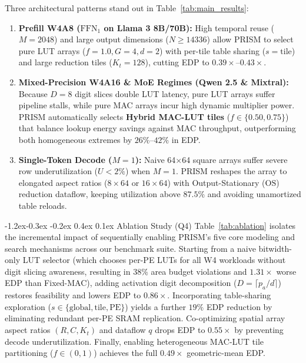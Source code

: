\documentclass[10pt,letterpaper,twocolumn]{article}
\makeatletter
\renewcommand\subsection{\@startsection{subsection}{2}{\z@}%
  {-1.2ex\@plus -0.3ex \@minus -0.2ex}%
  {0.4ex \@plus 0.1ex}%
  {\normalfont\normalsize\bfseries}}
\makeatother
\begin{document}
Three architectural patterns stand out in Table~\ref{tab:main_results}:
\begin{enumerate}
  \setlength{\itemsep}{1pt}\setlength{\parskip}{0pt}
  \item \textbf{Prefill W4A8 ($\text{FFN}_1$ on Llama 3 8B/70B):} High temporal reuse ($M=2048$) and large output dimensions ($N \ge 14336$) allow PRISM to select pure LUT arrays ($f=1.0, G=4, d=2$) with per-tile table sharing ($s=\text{tile}$) and large reduction tiles ($K_t=128$), cutting EDP to $0.39\times$--$0.43\times$.
  \item \textbf{Mixed-Precision W4A16 \& MoE Regimes (Qwen 2.5 \& Mixtral):} Because $D=8$ digit slices double LUT latency, pure LUT arrays suffer pipeline stalls, while pure MAC arrays incur high dynamic multiplier power. PRISM automatically selects \textbf{Hybrid MAC-LUT tiles} ($f \in \{0.50, 0.75\}$) that balance lookup energy savings against MAC throughput, outperforming both homogeneous extremes by $26\%$--$42\%$ in EDP.
  \item \textbf{Single-Token Decode ($M=1$):} Naive 64$\times$64 square arrays suffer severe row underutilization ($U < 2\%$) when $M=1$. PRISM reshapes the array to elongated aspect ratios ($8\times 64$ or $16\times 64$) with Output-Stationary ($\text{OS}$) reduction dataflow, keeping utilization above $87.5\%$ and avoiding unamortized table reloads.
\end{enumerate}

\subsection{Ablation Study (Q4)}
Table~\ref{tab:ablation} isolates the incremental impact of sequentially enabling PRISM's five core modeling and search mechanisms across our benchmark suite. Starting from a naive bitwidth-only LUT selector (which chooses per-PE LUTs for all W4 workloads without digit slicing awareness, resulting in $38\%$ area budget violations and $1.31\times$ worse EDP than Fixed-MAC), adding activation digit decomposition ($D=\lceil p_a/d \rceil$) restores feasibility and lowers EDP to $0.86\times$. Incorporating table-sharing exploration ($s \in \{\text{global}, \text{tile}, \text{PE}\}$) yields a further $19\%$ EDP reduction by eliminating redundant per-PE SRAM replication. Co-optimizing spatial array aspect ratios $(R, C, K_t)$ and dataflow $q$ drops EDP to $0.55\times$ by preventing decode underutilization. Finally, enabling heterogeneous MAC-LUT tile partitioning ($f \in (0,1)$) achieves the full $0.49\times$ geometric-mean EDP.
\end{document}
